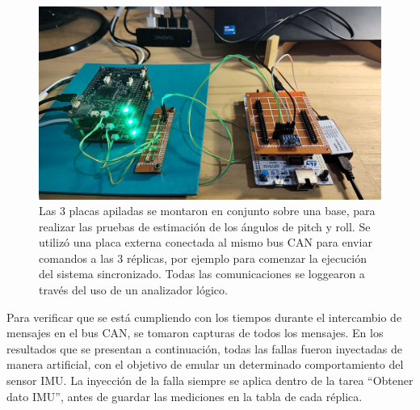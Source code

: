 \begin{figure}[!t]
    \centering
    \includegraphics[width=\textwidth]{img/placas_stack_analizador_logico.jpg}
    \caption{Las 3 placas apiladas se montaron en conjunto sobre una base, para realizar las pruebas de estimación de los ángulos de pitch y roll. Se utilizó una placa externa conectada al mismo bus CAN para enviar comandos a las 3 réplicas, por ejemplo para comenzar la ejecución del sistema sincronizado. Todas las comunicaciones se loggearon a través del uso de un analizador lógico.}
    \label{fig:pruebas_stackeadas}
\end{figure}







Para verificar que se está cumpliendo con los tiempos durante el intercambio de mensajes en el bus CAN, se tomaron capturas de todos los mensajes. En los resultados que se presentan a continuación, todas las fallas fueron inyectadas de manera artificial, con el objetivo de emular un determinado comportamiento del sensor IMU. La inyección de la falla siempre se aplica dentro de la tarea ``Obtener dato IMU'', antes de guardar las mediciones en la tabla de cada réplica.

